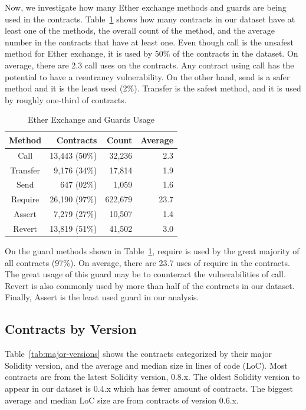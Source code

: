 \documentclass[10pt,conference]{IEEEtran}
\begin{document}
Now, we investigate how many Ether exchange methods and guards are being used in the contracts. Table~\ref{tab:results-all} shows how many contracts in our dataset have at least one of the methods, the overall count of the method, and the average number in the contracts that have at least one. Even though call is the unsafest method for Ether exchange, it is used by 50\% of the contracts in the dataset. On average, there are 2.3 call uses on the contracts. Any contract using call has the potential to have a reentrancy vulnerability. On the other hand, send is a safer method and it is the least used (2\%). Transfer is the safest method, and it is used by roughly one-third of contracts.

\begin{table}
\center
  \caption{Ether Exchange and Guards Usage}
  \label{tab:results-all}
  \begin{tabular}{crrr}
    \hline
    Method & Contracts & Count & Average \\
    \hline
    Call & 13,443 (50\%) & 32,236 & 2.3 \\
    Transfer & 9,176 (34\%) & 17,814 & 1.9 \\
    Send & 647 (02\%) & 1,059& 1.6 \\
    Require & 26,190 (97\%) & 622,679 & 23.7 \\
    Assert & 7,279 (27\%) & 10,507 & 1.4 \\
    Revert & 13,819 (51\%) & 41,502 & 3.0\\
    \hline
\end{tabular}
\end{table}

On the guard methods shown in Table~\ref{tab:results-all}, require is used by the great majority of all contracts (97\%). On average, there are 23.7 uses of require in the contracts. The great usage of this guard may be to counteract the vulnerabilities of call. Revert is also commonly used by more than half of the contracts in our dataset. Finally, Assert is the least used guard in our analysis.

\subsection{Contracts by Version}

Table~\ref{tab:major-versions} shows the contracts categorized by their major Solidity version, and the average and median size in lines of code (LoC). Most contracts are from the latest Solidity version, 0.8.x. The oldest Solidity version to appear in our dataset is 0.4.x which has fewer amount of contracts. The biggest average and median LoC size are from contracts of version 0.6.x.
\end{document}
